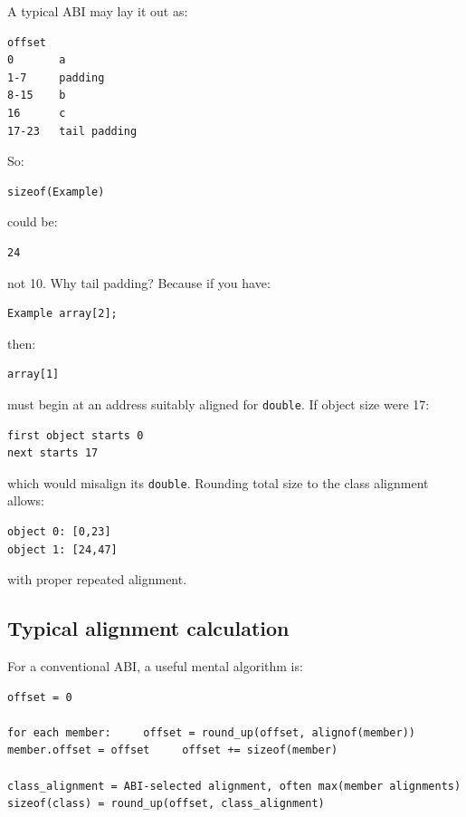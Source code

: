 A typical ABI may lay it out as:

\begin{verbatim}
offset
0       a
1-7     padding
8-15    b
16      c
17-23   tail padding
\end{verbatim}

So:

\begin{verbatim}
sizeof(Example)
\end{verbatim}

could be:

\begin{verbatim}
24
\end{verbatim}

not 10. Why tail padding? Because if you have:

\begin{verbatim}
Example array[2];
\end{verbatim}

then:

\begin{verbatim}
array[1]
\end{verbatim}

must begin at an address suitably aligned for \texttt{double}. If object size were 17:

\begin{verbatim}
first object starts 0
next starts 17
\end{verbatim}

which would misalign its \texttt{double}. Rounding total size to the class alignment allows:

\begin{verbatim}
object 0: [0,23]
object 1: [24,47]
\end{verbatim}

with proper repeated alignment.

\subsection{Typical alignment calculation}\label{01-foundations-i-ch003-typical-alignment-calculation}

For a conventional ABI, a useful mental algorithm is:

\begin{verbatim}
offset = 0

for each member:     offset = round_up(offset, alignof(member))     member.offset = offset     offset += sizeof(member)

class_alignment = ABI-selected alignment, often max(member alignments)
sizeof(class) = round_up(offset, class_alignment)
\end{verbatim}

